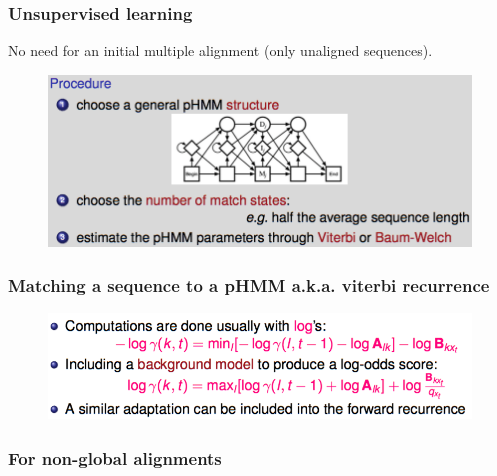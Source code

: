 \subsubsection{Unsupervised learning}

No need for an initial multiple alignment (only unaligned sequences).

\begin{figure}[htp]
	\centering
	\includegraphics[scale=0.5]{images/44_unsupervised.png}
\end{figure}

\subsubsection{Matching a sequence to a pHMM a.k.a. viterbi recurrence}


\begin{figure}[H]
	\centering
	\includegraphics[scale=0.5]{images/45_viterbi.png}
\end{figure}

\newpage

\subsubsection{For non-global alignments}



